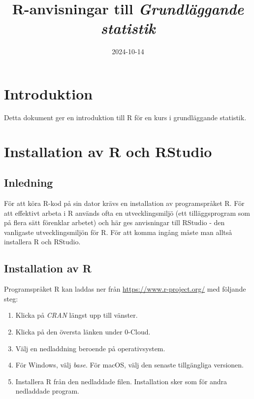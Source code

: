 \documentclass[
]{book}
\title{R-anvisningar till \emph{Grundläggande statistik}}
\author{}
\date{\vspace{-2.5em}2024-10-14}
\providecommand{\tightlist}{%
  \setlength{\itemsep}{0pt}\setlength{\parskip}{0pt}}
\theoremstyle{definition}
\theoremstyle{definition}
\theoremstyle{definition}
\theoremstyle{definition}
\theoremstyle{remark}
\begin{document}
\maketitle

{
\setcounter{tocdepth}{1}
\tableofcontents
}
\chapter*{Introduktion}\label{introduktion}

Detta dokument ger en introduktion till R för en kurs i grundläggande statistik.

\chapter*{Installation av R och RStudio}\label{installation-av-r-och-rstudio}

\section{Inledning}\label{inledning}

För att köra R-kod på sin dator krävs en installation av programspråket R. För att effektivt arbeta i R används ofta en utvecklingsmiljö (ett tilläggsprogram som på flera sätt förenklar arbetet) och här ges anvisningar till RStudio - den vanligaste utvecklingsmiljön för R. För att komma ingång måste man alltså installera R och RStudio.

\section{Installation av R}\label{installation-av-r}

Programspråket R kan laddas ner från \url{https://www.r-project.org/} med följande steg:

\begin{enumerate}
\def\labelenumi{\arabic{enumi}.}
\tightlist
\item
  Klicka på \emph{CRAN} längst upp till vänster.
\item
  Klicka på den översta länken under 0-Cloud.
\item
  Välj en nedladdning beroende på operativsystem.
\item
  För Windows, välj \emph{base}. För macOS, välj den senaste tillgängliga versionen.
\item
  Installera R från den nedladdade filen. Installation sker som för andra nedladdade program.
\end{enumerate}
\end{document}
